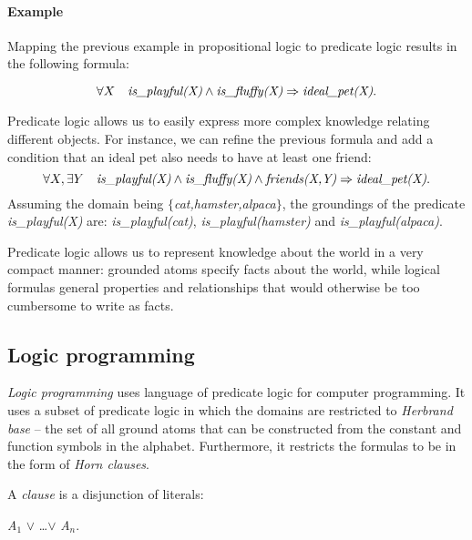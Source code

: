 \paragraph{Example} Mapping the previous example in propositional logic to predicate logic results in the following formula:

$$\forall X \quad \text{\textit{is\_playful(X)}} \wedge \text{\textit{is\_fluffy(X)}} \Rightarrow \text{\textit{ideal\_pet(X)}}. $$

 Predicate logic allows us to easily express more complex knowledge relating different objects.
 For instance, we can refine the previous formula and add a condition that an ideal pet also needs to have at least one friend:
 $$\forall X, \exists Y \quad \text{\textit{is\_playful(X)}} \wedge \text{\textit{is\_fluffy(X)}} \wedge \text{\textit{friends(X,Y)}} \Rightarrow \text{\textit{ideal\_pet(X)}}. $$
 Assuming the domain being $\{$\textit{cat,hamster,alpaca}$\}$, the groundings of the predicate \textit{is\_playful(X)} are: \textit{is\_playful(cat)}, \textit{is\_playful(hamster)} and \textit{is\_playful(alpaca)}.




 Predicate logic allows us to represent knowledge about the world in a very compact manner: grounded atoms specify facts about the world, while logical formulas general properties and relationships that would otherwise be too cumbersome to write as facts.










\subsection{Logic programming}


\textit{Logic programming} uses language of predicate logic for computer programming.
It uses a subset of predicate logic in which the domains are restricted to \textit{Herbrand base} -- the set of all ground atoms that can be constructed from the constant and function symbols in the alphabet.
Furthermore, it restricts the formulas to be in the form of \textit{Horn clauses}.


A \textit{clause} is a disjunction of literals:

\begin{center}
	\textit{A}$_1$  $\vee$ \ldots $\vee$ \textit{A}$_n$.
\end{center}

